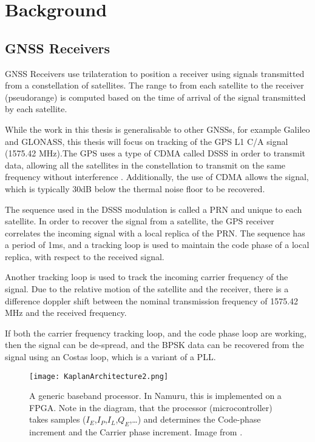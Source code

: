 \chapter{Background}\label{ch:background}

\section{\ac{GNSS} Receivers}

\ac{GNSS} Receivers use trilateration to position a receiver using signals transmitted from a constellation of satellites. The range to from each satellite to the receiver (pseudorange) is computed based on the time of arrival of the signal transmitted by each satellite. 

While the work in this thesis is generalisable to other \ac{GNSS}s, for example Galileo and GLONASS, this thesis will focus on tracking of the GPS L1 C/A signal (1575.42 MHz).The \ac{GPS} uses a type of \ac{CDMA} called \ac{DSSS} in order to transmit data, allowing all the satellites in the constellation to transmit on the same frequency without interference \cite{Ublox}. Additionally, the use of \ac{CDMA} allows the signal, which is typically 30dB below the thermal noise floor to be recovered\cite{Gleason,Tsui}.

The sequence used in the \ac{DSSS} modulation is called a \ac{PRN} and unique to each satellite. In order to recover the signal from a satellite, the GPS receiver correlates the incoming signal with a local replica of the \ac{PRN}. The sequence has a period of 1ms, and a tracking loop is used to maintain the code phase of a local replica, with respect to the received signal. 

Another tracking loop is used to track the incoming carrier frequency of the signal. Due to the relative motion of the satellite and the receiver, there is a difference doppler shift between the nominal transmission frequency of 1575.42 MHz and the received frequency. 

If both the carrier frequency tracking loop, and the code phase loop are working, then the signal can be de-spread, and the \ac{BPSK} data can be recovered from the signal using an Costas loop, which is a variant of a \ac{PLL}.


\begin{figure}[!htb] 
    \centering
    \texttt{[image: KaplanArchitecture2.png]} 
    \caption{A generic baseband processor. In Namuru, this is implemented on a \ac{FPGA}. Note in the diagram, that the processor (microcontroller) takes samples ($I_E$,$I_P$,$I_L$,$Q_E$,\ldots) and determines the Code-phase increment and the Carrier phase increment. Image from \cite{Kaplan}.}
    \label{fig:KaplanArchitecture}
\end{figure}


